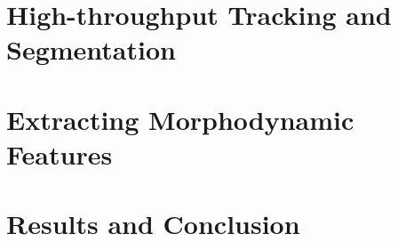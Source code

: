 \documentclass{llncs}
\begin{document}
\vspace{-3mm}
\section{High-throughput Tracking and Segmentation}
\label{sec:method}


\vspace{-3mm}
\section{Extracting Morphodynamic Features}
\label{sec:features}


\vspace{-3mm}
\section{Results and Conclusion}
\label{sec:results}


%

\vspace{-4mm}

\footnotesize{

% 
}
\end{document}

